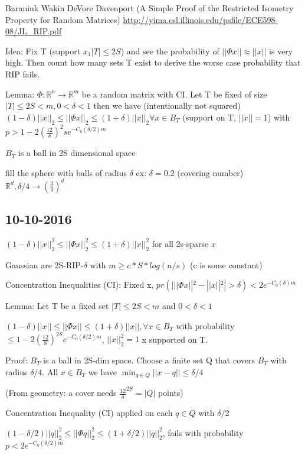 \documentclass[12pt,letterpaper]{report}
\begin{document}
Baraniuk Wakin DeVore Davenport (A Simple Proof of the Restricted Isometry Property for Random Matrices)
\url{http://yima.csl.illinois.edu/psfile/ECE598-08/JL_RIP.pdf}

Idea:  Fix T (support $x_1 |T| \leq 2S$) and see the probability of $||\Phi x|| \approx ||x||$ is very high.  Then count how many sets T exist to derive the worse case probability that RIP fails.

Lemma: $\Phi : \mathbb{R}^n \rightarrow \mathbb{R}^m$ be a random matrix with CI.  Let T be fixed of size $|T| \leq 2S < m, 0 < \delta < 1$ then we have (intentionally not squared) $(1-\delta)||x||_2 \leq ||\Phi x||_2 \leq (1+\delta)||x||_2 \forall x \in B_T$ (support on T, $||x|| =1$) with $p >  1 - 2(\frac{12}{\delta})^2s e^{-C_0(\delta/2)m}$

$B_T$ is a ball in 2S dimensional space

fill the sphere with balls of radius $\delta$ ex: $\delta = 0.2$ (covering number) $\mathbb{R}^d, \delta/4 \rightarrow (\frac{3}{\delta})^d$

\subsection*{10-10-2016}

$(1-\delta)||x||_2^2 \leq ||\Phi x||_2^2 \leq (1+\delta)||x||_2^2$ for all 2s-sparse $x$

Gaussian are 2S-RIP-$\delta$ with $m \geq c*S*log(n/s)$ (c is some constant)

Concentration Inequalities (CI): Fixed x, $pr(| ||\Phi x||^2 - ||x||^2| > \delta) < 2 e^{-C_0(\delta)m}$

Lemma: Let T be a fixed set $|T| \leq 2S < m$ and $0 < \delta < 1$

$(1-\delta)||x|| \leq ||\Phi x|| \leq (1+\delta)||x||, \forall x \in B_T$ with probability $\leq 1 - 2(\frac{12}{8})^{2S}e^{-C_0(\delta/2)m}$, $||x||_2^2 = 1$ x supported on T.

Proof: $B_T$ is a ball in 2S-dim space.  Choose a finite set Q that covers $B_T$ with radius $\delta/4$.  All $x \in B_T$ we have $\min_{q \in Q} ||x - q|| \leq \delta/4$

(From geometry: a cover needs $\frac{12}{\delta}^{2S} = |Q|$ points)

Concentration Inequality (CI) applied on each $q \in Q$ with $\delta/2$

$(1-\delta/2)||q||_2^2 \leq ||\Phi q||_2^2 \leq (1+\delta/2)||q||_2^2$, fails with probability $p < 2 e^{-C_0(\delta/2)m}$
\end{document}
